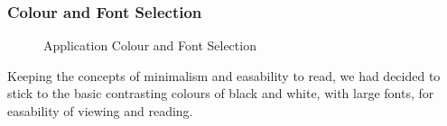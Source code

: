 \documentclass[14pt]{report}
\begin{document}
				\subsubsection{Colour and Font Selection}
				\begin{figure}[h]
					\centering
					\qquad
					\caption{Application Colour and Font Selection}%
					\label{fig:ColourSelect}%
				\end{figure}
					Keeping the concepts of minimalism and easability to read, we had decided to stick to the basic contrasting colours of black and white, with large fonts, for easability of viewing and reading.\\
					
\end{document}
